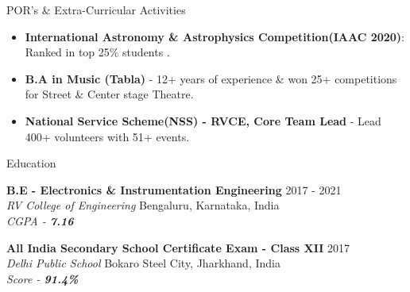 \documentclass{resume} %
\begin{document}
\begin{rSection}{\Large POR's \& Extra-Curricular Activities} 
\begin{itemize}
    \item \textbf{International Astronomy \& Astrophysics Competition(IAAC 2020)}: Ranked in top 25\% students .
    \item \textbf{B.A in Music (Tabla)} - 12+ years of experience \& won 25+ competitions for Street \& Center stage Theatre.
    \item \textbf{National Service Scheme(NSS)  - RVCE, Core Team Lead} - Lead 400+ volunteers with 51+ events.
\end{itemize}


\end{rSection}


\begin{rSection}{\Large Education}


{\bf B.E - Electronics \& Instrumentation Engineering}  \hfill {2017 - 2021} \\
\textit{RV College of Engineering} \hfill {Bengaluru, Karnataka, India}\\
\textit{CGPA - \textbf{7.16}}

{\bf All India Secondary School Certificate Exam - Class XII} \hfill{2017} \\ \textit{Delhi Public School} \hfill{Bokaro Steel City, Jharkhand, India} \\ 
\textit{Score - \textbf{91.4\%}}


\end{rSection}
\end{document}

